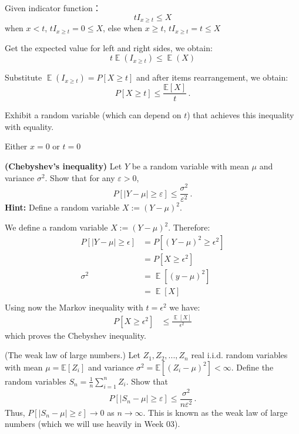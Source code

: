 \documentclass[a4paper,10pt]{article}
\DeclareMathOperator{\EX}{\mathbb{E}}%
\begin{document}
\begin{solution}

Given indicator function：
$$tI_{x\ge t} \le X$$ 
when $x<t$, $tI_{x\ge t}=0 \le X$,
else when $x\ge t$, $tI_{x\ge t}=t \le X$

Get the expected value for left and right sides, we obtain:
$$t\EX(I_{x\ge t}) \le \EX(X)$$ 

Substitute $\EX(I_{x\ge t}) = P[X \geq t]$ and after items rearrangement, we obtain:
	\[
	P[X \geq t] \leq \frac{\mathbb{E}[X]}{t}\, .
	\]
\end{solution}

\begin{subproblem}{1}
	Exhibit a random variable (which can depend on $t$) that achieves this inequality with equality.
\end{subproblem}

\begin{solution}
Either $x=0$ or $t=0$
\end{solution}

\begin{subproblem}{3} \textbf{(Chebyshev's inequality)} Let $Y$ be a random variable with mean $\mu$ and variance $\sigma^2$. Show that for any $\varepsilon > 0$,
	\[
	P[|Y - \mu| \geq \varepsilon] \leq \frac{\sigma^2}{\varepsilon^2} \, .
	\]
	\textbf{Hint:} Define a random variable $X := (Y - \mu)^2$.
\end{subproblem}

\begin{solution}
We define a random variable \(X := {(Y-\mu)}^2\). Therefore:
\begin{align*}
    P[|Y-\mu| \geq \epsilon]
    &= P[{(Y-\mu)}^2 \geq \epsilon^2] \\
    &= P[X\geq \epsilon^2]\\
    \sigma^2
    &= \EX[{(y-\mu)}^2]\\
    &= \EX[X]\\
\end{align*}
Using now the Markov inequality with \(t=\epsilon^2\) we have:
\begin{align*}
    P[X\geq \epsilon^2] &\leq \frac{\EX[X]}{\epsilon^2}
\end{align*}
which proves the Chebyshev inequality.

\end{solution}

\begin{subproblem}{3} (The weak law of large numbers.) Let $Z_1, Z_2, ..., Z_n$ real i.i.d. random variables with mean $\mu = \mathbb{E}[Z_i]$ and variance $\sigma^2 = \mathbb{E}[(Z_i - \mu)^2] < \infty$. Define the random variables $S_n = \frac{1}{n} \sum_{i=1}^n Z_i$. Show that
	\[
	P[|S_n - \mu | \geq \varepsilon] \leq \frac{\sigma^2}{n\varepsilon^2}\, .
	\]
	Thus, $P[|S_n - \mu| \geq \varepsilon] \to 0$ as $n \to \infty$. This is known as the weak law of large numbers (which we will use heavily in Week 03).
\end{subproblem}
\end{document}
